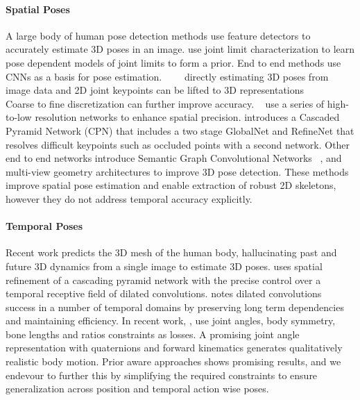 \documentclass[runningheads]{llncs}
\begin{document}
\paragraph{Spatial Poses}

A large body of human pose detection methods use feature detectors to accurately estimate 3D poses in an image.  \cite{sminchisescu20083d} \cite{ramakrishna2012reconstructing} \cite{ionescu2014iterated} \cite{ionescu2014iterated} \cite{akhter2015pose} \cite{jiang2018data} use joint limit characterization to learn pose dependent models of joint limits to form a prior.  
End to end methods use CNNs as a basis for pose estimation.~\cite{li20143d}~\cite{tekin2016direct}~\cite{tekin2016direct}~\cite{martinez2017simple} directly estimating 3D poses from image data and 2D joint keypoints can be lifted to 3D representations \cite{jiang20103d}~\cite{martinez2017simple}~\cite{pavlakos2017coarse}~\cite{tekin2017learning}~\cite{chen20173d}~\cite{rayat2017exploiting}~\cite{pavlakos2018ordinal} 
Coarse to fine discretization can further improve accuracy. \cite{pavlakos2017coarse}~\cite{sun2019deep} use a series of high-to-low resolution networks to enhance spatial precision.  
\cite{chen2018cascaded} introduces a Cascaded Pyramid Network (CPN) that includes a two stage GlobalNet and RefineNet that resolves difficult keypoints such as occluded points with a second network.  
Other end to end networks \cite{zhao2019semantic} introduce Semantic Graph Convolutional Networks ~\cite{chen2019weakly}, and ~\cite{kocabas2019self} multi-view geometry architectures to improve 3D pose detection.  
These methods improve spatial pose estimation and enable extraction of robust 2D skeletons, however they do not address temporal accuracy explicitly.

\paragraph{Temporal Poses}

Recent work \cite{kanazawa2019learning} predicts the 3D mesh of the human body, hallucinating past and future 3D dynamics from a  single image to estimate 3D poses. \cite{pavllo20193d} uses spatial refinement of a cascading pyramid network \cite{chen2018cascaded} with the precise control over a temporal receptive field of dilated convolutions. \cite{pavllo20193d} notes dilated convolutions ~\cite{holschneider1990real} success in a number of temporal domains \cite{yu2015multi} \cite{zhou2016sparseness} \cite{kalchbrenner2016neural} by preserving long term dependencies and maintaining efficiency. In recent work, \cite{pavllo20193d}, \cite{dabral2018learning} use joint angles, body symmetry, bone lengths and ratios constraints as losses. A promising joint angle representation \cite{pavllo2019modeling} with quaternions and forward kinematics generates qualitatively realistic body motion.  
Prior aware approaches shows promising results, and we endevour to further this by simplifying the required constraints to ensure generalization across position and temporal action wise poses.
\end{document}
